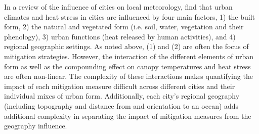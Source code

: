 \documentclass[final,3p,times,authoryear]{elsarticle}
\begin{document}


In a review of the influence of cities on local meteorology, \cite{Masson2020a} find that urban climates and heat stress in cities are influenced by four main factors, 1) the built form, 2) the natural and vegetated form (i.e. soil, water, vegetation and their phenology), 3) urban functions (heat released by human activities), and 4) regional geographic settings. As noted above, (1) and (2) are often the focus of mitigation strategies. However, the interaction of the different elements of urban form as well as the compounding effect on canopy temperatures and heat stress are often non-linear. The complexity of these interactions makes quantifying the impact of each mitigation measure difficult across different cities and their individual mixes of urban form. Additionally, each city's regional geography (including topography and distance from and orientation to an ocean) adds additional complexity in separating the impact of mitigation measures from the geography influence. 
\end{document}
